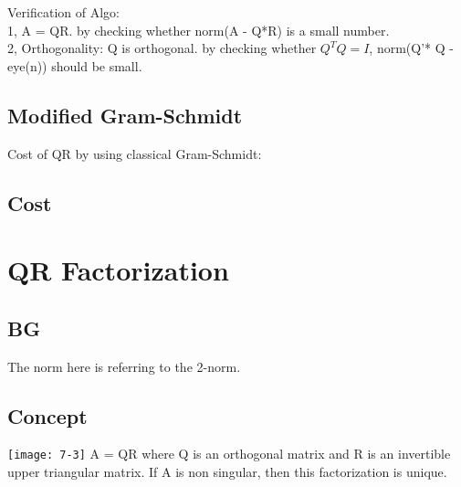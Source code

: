 \documentclass{article}
\begin{document}
\noindent
Verification of Algo:\\
1, A = QR. by checking whether norm(A - Q*R) is a small number.\\
2, Orthogonality: Q is orthogonal. by checking whether $Q^TQ = I$, norm(Q'* Q - eye(n)) should be small.

\subsection{Modified Gram-Schmidt}

Cost of QR by using classical Gram-Schmidt:\\


\subsection*{Cost}



\pagebreak
\section{QR Factorization}
\subsection{BG}
The norm here is referring to the 2-norm.\\
\subsection{Concept}
\texttt{[image: 7-3]}
A = QR where Q is an orthogonal matrix and R is an invertible upper triangular matrix. If A is
non singular, then this factorization is unique.\\

\end{document}
